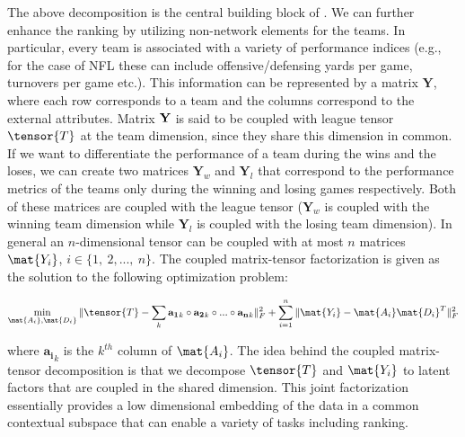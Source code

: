 The above decomposition is the central building block of {\methodt}.  
We can further enhance the ranking by utilizing non-network elements for the teams. 
In particular, every team is associated with a variety of performance indices (e.g., for the case of NFL these can include offensive/defensing yards per game, turnovers per game etc.).  
This information can be represented by a matrix $\bm{Y}$, where each row corresponds to a team and the columns correspond to the external attributes.  
Matrix $\bf{Y}$ is said to be coupled with league tensor $\tensor{T}$ at the team dimension, since they share this dimension in common.  
If we want to differentiate the performance of a team during the wins and the loses, we can create two matrices $\bm{Y}_w$ and $\bm{Y}_l$ that correspond to the performance metrics of the teams only during the winning and losing games respectively.  
Both of these matrices are coupled with the league tensor ($\bm{Y}_w$ is coupled with the winning team dimension while $\bm{Y}_l$ is coupled with the losing team dimension). 
%
In general an $n$-dimensional tensor can be coupled with at most $n$ matrices $\mat{Y_i}$, $i\in\{1,~2,...,~n\}$.  
The coupled matrix-tensor factorization is given as the solution to the following optimization problem:

\begin{equation}
\displaystyle \min_{\mat{A_i},\mat{D_i}} \|\tensor{T} - \displaystyle {\sum_{k}  \mathbf{a_1}_k \circ \mathbf{a_2}_k \circ...\circ \mathbf{a_n}_k }\|_{F}^{2} +\sum_{i=1}^n\|\mat{Y_i}-\mat{A_i}\mat{D_i}^T\|_{F}^{2} %
\label{eq:factorization}
\end{equation}

\noindent where $\mathbf{a_i}_k$ is the %
$k^{th}$ column of $\mat{A_i}$.  
The idea behind the coupled matrix-tensor decomposition is that we decompose $\tensor{T}$ and $\mat{Y_i}$ to latent factors that are coupled in the shared dimension.  
This joint factorization essentially provides a low dimensional embedding of the data in a common contextual subspace that can enable a variety of tasks including ranking.    



